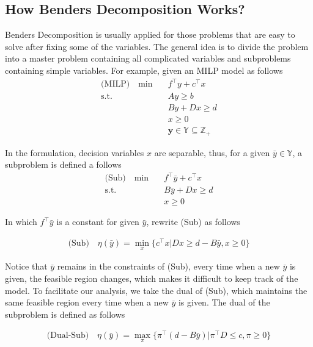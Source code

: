         \subsection{How Benders Decomposition Works?}
            Benders Decomposition is usually applied for those problems that are easy to solve after fixing some of the variables. The general idea is to divide the problem into a master problem containing all complicated variables and subproblems containing simple variables. For example, given an MILP model as follows
            \begin{align*}
                \text{(MILP)} \quad \min \quad & f^\top y + c^\top x \\
                \text{s.t.} \quad & A y \ge b \\
                & By + Dx \ge d\\
                & x \ge 0\\
                & \mathbf{y} \in \mathbb{Y} \subseteq \mathbb{Z}_+
            \end{align*}

            In the formulation, decision variables $x$ are separable, thus, for a given $\bar{y} \in \mathbb{Y}$, a subproblem is defined a follows
            \begin{align*}
                \text{(Sub)} \quad \min \quad & f^\top \bar{y} + c^\top x\\
                \text{s.t.} \quad & B \bar{y} + Dx \ge d\\
                & x \ge 0
            \end{align*}

            In which $f^\top \bar{y}$ is a constant for given $\bar{y}$, rewrite (Sub) as follows

            \begin{align*}
                \text{(Sub)} \quad \eta(\bar{y}) = \min_x \{c^\top x | D x \ge d - B \bar{y}, x \ge 0\}
            \end{align*}

            Notice that $\bar{y}$ remains in the constraints of (Sub), every time when a new $\bar{y}$ is given, the feasible region changes, which makes it difficult to keep track of the model. To facilitate our analysis, we take the dual of (Sub), which maintains the same feasible region every time when a new $\bar{y}$ is given. The dual of the subproblem is defined as follows

            \begin{align*}
                \text{(Dual-Sub)} \quad \eta(\bar{y}) = \max_{\pi} \{\pi^\top (d - B\bar{y})| \pi^\top D \le c, \pi \ge 0\}
            \end{align*}

